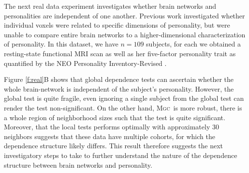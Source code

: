 \documentclass[11pt]{article}
\newcommand{\note}[2][]{\added[#1,remark={#2}]{}}
\providecommand{\sct}[1]{{\normalfont\textsc{#1}}}
\newcommand{\Migraine}{\sct{Migraine}}
\newcommand{\mtg}{\sct{m2g}}
\newcommand{\Mgc}{\sct{Mgc}}
\newcommand{\jv}[1]{{\note{jv: #1}}}
\newcommand{\cs}[1]{{\note{cs: #1}}}
\begin{document}
The next real data experiment investigates whether brain networks and personalities are independent of one another. Previous work \cite{AdelsteinEtAl2011} investigated whether individual voxels were related to specific dimensions of personality, but were unable to compare entire brain networks to a higher-dimensional characterization of personality. 
In this dataset, we have $n=109$ subjects, for each we obtained a resting-state functional MRI scan as well as her five-factor personality trait as quantified by  the NEO Personality Inventory-Revised  \cite{Costa1992}. \cs{how many subjects? which atlas did we use? how did we represent the data? what metric did we use for each view? etc.}  
\jv{this section is for \Migrain~vs CCI, which is not the five factor model? or it is?
in total 109 subjects, the \Migrain data is already a distance matrices, the CCI data is a numeric vector with values ranging from 75 to 115 followed by Euclidean distance. For other information, I don't know & we have to ask Youngser (who passed me the data)?
}

 Figure \ref{f:real}B shows that  global dependence tests can ascertain whether the whole brain-network is independent of the subject's personality.  However, the global test is quite fragile, even ignoring a single subject from the global test can render the test non-significant.  On the other hand, \Mgc~is more robust, there is a whole region of neighborhood sizes such that the test is quite significant.  Moreover, that the local tests performs optimally with approximately 30 neighbors suggests that these data have multiple cohorts, for which the dependence structure likely differs.  This result therefore suggests  the next investigatory steps to take to further understand the nature of the dependence structure between brain networks and personality.



\end{document}
